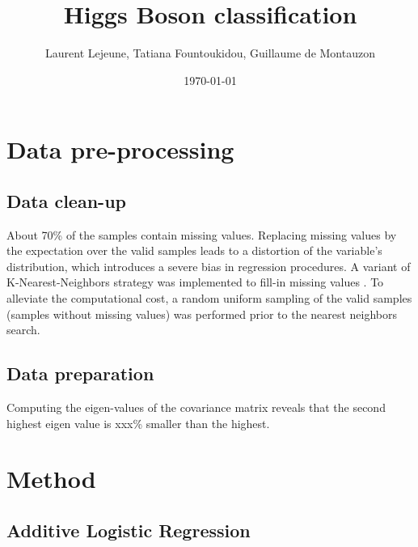 \documentclass[11pt]{article}
\author{Laurent Lejeune, Tatiana Fountoukidou, Guillaume de Montauzon}
\date{\today}
\title{Higgs Boson classification}
\begin{document}
\maketitle


\section{Data pre-processing}
\label{sec:orgheadline3}

\subsection{Data clean-up}
\label{sec:orgheadline1}
About 70\% of the samples contain missing values. Replacing missing values by the expectation over the valid samples leads to a distortion of the variable's distribution, which introduces a severe bias in regression procedures. A variant of K-Nearest-Neighbors strategy was implemented to fill-in missing values \cite{malarvizhi12}. To alleviate the computational cost, a random uniform sampling of the valid samples (samples without missing values) was performed prior to the nearest neighbors search.

\subsection{Data preparation}
\label{sec:orgheadline2}
Computing the eigen-values of the covariance matrix reveals that the second highest eigen value is xxx\% smaller than the highest.

\section{Method}
\label{sec:orgheadline5}
\subsection{Additive Logistic Regression \cite{friedman98}}
\label{sec:orgheadline4}




\printbibliography
\end{document}
